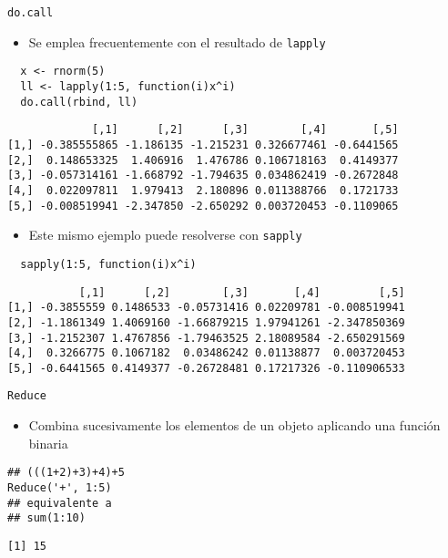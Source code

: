 \documentclass[xcolor={usenames,svgnames,dvipsnames}]{beamer}
\begin{document}
\begin{frame}[fragile,label={sec:orgheadline31}]{\texttt{do.call}}
 \begin{itemize}
\item Se emplea frecuentemente con el resultado de \texttt{lapply}
\end{itemize}
\lstset{language=R,label= ,caption= ,captionpos=b,numbers=none}
\begin{lstlisting}
  x <- rnorm(5)
  ll <- lapply(1:5, function(i)x^i)
  do.call(rbind, ll)
\end{lstlisting}

\begin{verbatim}
             [,1]      [,2]      [,3]        [,4]       [,5]
[1,] -0.385555865 -1.186135 -1.215231 0.326677461 -0.6441565
[2,]  0.148653325  1.406916  1.476786 0.106718163  0.4149377
[3,] -0.057314161 -1.668792 -1.794635 0.034862419 -0.2672848
[4,]  0.022097811  1.979413  2.180896 0.011388766  0.1721733
[5,] -0.008519941 -2.347850 -2.650292 0.003720453 -0.1109065
\end{verbatim}

\begin{itemize}
\item Este mismo ejemplo puede resolverse con \texttt{sapply}
\end{itemize}
\lstset{language=R,label= ,caption= ,captionpos=b,numbers=none}
\begin{lstlisting}
  sapply(1:5, function(i)x^i)
\end{lstlisting}

\begin{verbatim}
           [,1]      [,2]        [,3]       [,4]         [,5]
[1,] -0.3855559 0.1486533 -0.05731416 0.02209781 -0.008519941
[2,] -1.1861349 1.4069160 -1.66879215 1.97941261 -2.347850369
[3,] -1.2152307 1.4767856 -1.79463525 2.18089584 -2.650291569
[4,]  0.3266775 0.1067182  0.03486242 0.01138877  0.003720453
[5,] -0.6441565 0.4149377 -0.26728481 0.17217326 -0.110906533
\end{verbatim}
\end{frame}

\begin{frame}[fragile,label={sec:orgheadline32}]{\texttt{Reduce}}
 \begin{itemize}
\item Combina sucesivamente los elementos de un objeto aplicando una
función binaria
\end{itemize}
\lstset{language=R,label= ,caption= ,captionpos=b,numbers=none}
\begin{lstlisting}
## (((1+2)+3)+4)+5
Reduce('+', 1:5)
## equivalente a 
## sum(1:10)
\end{lstlisting}

\begin{verbatim}
[1] 15
\end{verbatim}
\end{frame}
\end{document}

